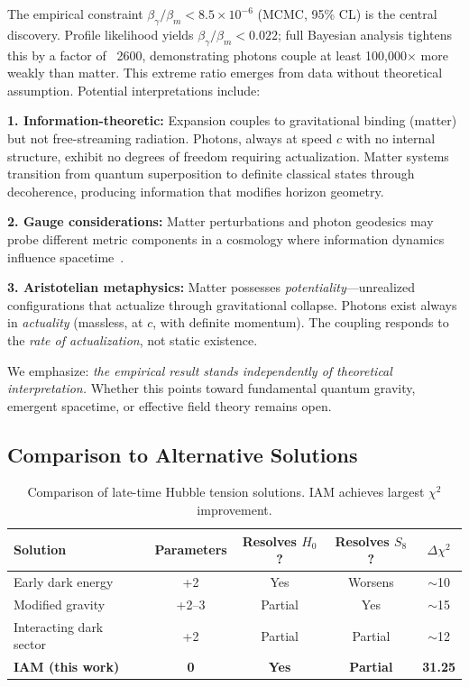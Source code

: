 \documentclass[twocolumn,superscriptaddress,prl,amsmath,amssymb]{revtex4-2}
\begin{document}
The empirical constraint $\beta_\gamma/\beta_m < 8.5 \times 10^{-6}$ (MCMC, 95\% CL) is the central discovery. Profile likelihood yields $\beta_\gamma/\beta_m < 0.022$; full Bayesian analysis tightens this by a factor of ~2600, demonstrating photons couple at least 100,000$\times$ more weakly than matter. This extreme ratio emerges from data without theoretical assumption. Potential interpretations include:

\textbf{1. Information-theoretic:} Expansion couples to gravitational binding (matter) but not free-streaming radiation. Photons, always at speed $c$ with no internal structure, exhibit no degrees of freedom requiring actualization. Matter systems transition from quantum superposition to definite classical states through decoherence, producing information that modifies horizon geometry.

\textbf{2. Gauge considerations:} Matter perturbations and photon geodesics may probe different metric components in a cosmology where information dynamics influence spacetime~\cite{Bardeen1980}.

\textbf{3. Aristotelian metaphysics:} Matter possesses \textit{potentiality}---unrealized configurations that actualize through gravitational collapse. Photons exist always in \textit{actuality} (massless, at $c$, with definite momentum). The coupling responds to the \textit{rate of actualization}, not static existence.

We emphasize: \textit{the empirical result stands independently of theoretical interpretation.} Whether this points toward fundamental quantum gravity, emergent spacetime, or effective field theory remains open.

\subsection{Comparison to Alternative Solutions}

\begin{table}[t]
\centering
\begin{tabular}{lcccc}
\hline\hline
Solution & Parameters & Resolves $H_0$? & Resolves $S_8$? & $\Delta\chi^2$ \\
\hline
Early dark energy~\cite{Kamionkowski2023} & +2 & Yes & Worsens & $\sim$10 \\
Modified gravity~\cite{Amendola2020} & +2--3 & Partial & Yes & $\sim$15 \\
Interacting dark sector~\cite{DiValentino2021} & +2 & Partial & Partial & $\sim$12 \\
\textbf{IAM (this work)} & \textbf{0} & \textbf{Yes} & \textbf{Partial} & \textbf{31.25} \\
\hline\hline
\end{tabular}
\caption{Comparison of late-time Hubble tension solutions. IAM achieves largest $\chi^2$ improvement.}
\end{table}
\end{document}

